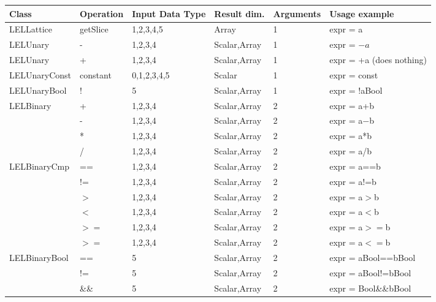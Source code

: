 \newpage
\begin{center}
\begin{tabular}{|l|l|l|l|l|l}
\hline
 Class  & Operation  & Input Data Type  & Result dim. & Arguments  & Usage example \\
\hline
LELLattice   &       getSlice   &   1,2,3,4,5  &  Array           &   1   &    expr = a \\
LELUnary     &        -         &   1,2,3,4    &  Scalar,Array    &   1   &   expr = $-a$ \\
LELUnary     &         +        &   1,2,3,4    &   Scalar,Array   &   1   &   expr = +a (does nothing) \\
LELUnaryConst &      constant   &   0,1,2,3,4,5&   Scalar         &   1   &   expr = const \\
LELUnaryBool  &        !        &   5          &   Scalar,Array   &   1   &   expr = !aBool \\
LELBinary   &          +        &   1,2,3,4    &   Scalar,Array   &   2   &   expr = a+b \\
             &         -        &   1,2,3,4    &   Scalar,Array   &   2   &   expr = a$-$b \\
              &        *        &   1,2,3,4    &   Scalar,Array   &   2   &   expr = a*b \\
               &       /        &   1,2,3,4    &   Scalar,Array   &   2   &   expr = a/b \\
LELBinaryCmp  &        ==       &   1,2,3,4    &   Scalar,Array   &   2   &   expr = a==b \\
               &       !=       &   1,2,3,4    &   Scalar,Array   &   2   &   expr = a!=b \\
                &      $>$        &   1,2,3,4    &   Scalar,Array   &   2   &   expr = a$>$b \\
              &        $<$        &   1,2,3,4    &   Scalar,Array   &   2   &   expr = a$<$b \\
               &       $>=$       &   1,2,3,4    &   Scalar,Array   &   2   &   expr = a$>=$b \\
                &      $>=$       &   1,2,3,4    &   Scalar,Array   &   2   &   expr = a$<=$b \\
LELBinaryBool &        ==       &   5          &   Scalar,Array   &   2   &   expr = aBool==bBool \\
               &       !=       &   5          &   Scalar,Array   &   2   &   expr = aBool!=bBool \\
                &      \&\&     &   5          &   Scalar,Array   &   2   &   expr = Bool\&\&bBool \\

\end{tabular}
\end{center}
